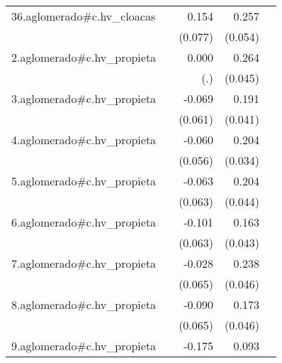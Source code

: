 {\begin{longtable}{l*{4}{D{.}{.}{-1}}}
\addlinespace
36.aglomerado#c.hv\_cloacas&                     &       0.154\sym{*}  &       0.257\sym{***}&                     \\
            &                     &     (0.077)         &     (0.054)         &                     \\
\addlinespace
2.aglomerado#c.hv\_propieta&                     &       0.000         &       0.264\sym{***}&                     \\
            &                     &         (.)         &     (0.045)         &                     \\
\addlinespace
3.aglomerado#c.hv\_propieta&                     &      -0.069         &       0.191\sym{***}&                     \\
            &                     &     (0.061)         &     (0.041)         &                     \\
\addlinespace
4.aglomerado#c.hv\_propieta&                     &      -0.060         &       0.204\sym{***}&                     \\
            &                     &     (0.056)         &     (0.034)         &                     \\
\addlinespace
5.aglomerado#c.hv\_propieta&                     &      -0.063         &       0.204\sym{***}&                     \\
            &                     &     (0.063)         &     (0.044)         &                     \\
\addlinespace
6.aglomerado#c.hv\_propieta&                     &      -0.101         &       0.163\sym{***}&                     \\
            &                     &     (0.063)         &     (0.043)         &                     \\
\addlinespace
7.aglomerado#c.hv\_propieta&                     &      -0.028         &       0.238\sym{***}&                     \\
            &                     &     (0.065)         &     (0.046)         &                     \\
\addlinespace
8.aglomerado#c.hv\_propieta&                     &      -0.090         &       0.173\sym{***}&                     \\
            &                     &     (0.065)         &     (0.046)         &                     \\
\addlinespace
9.aglomerado#c.hv\_propieta&                     &      -0.175\sym{**} &       0.093\sym{*}  &                     \\

\end{longtable}}
